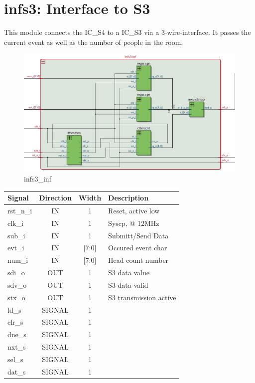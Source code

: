 \documentclass[12pt,a4 paper] {report}
\begin{document}
\section{infs3: Interface to S3}
This module connects the IC\_S4 to a IC\_S3 via a 3-wire-interface. It passes the current event as well as the number 
of people in the room.
\begin{figure}[h]
	\centering	
	\includegraphics[scale=0.25]{../png/infs3_inf.png}
	\caption{infs3\_inf}
\end{figure}
\begin{center}
	\begin{tabular}{ | p{2cm} | c | c | p{5cm} |}
		\hline
		\textbf{Signal} & \textbf{Direction} & \textbf{Width} & \textbf{Description} \\
		\hline	
  	rst\_n\_i & IN & 1 & Reset, active low \\
  	\hline
		clk\_i & IN & 1 & Syscp, @ 12MHz \\
		\hline
		sub\_i & IN & 1 & Submitt/Send Data \\
		\hline
		evt\_i & IN & [7:0] &  Occured event char \\
		\hline
		num\_i & IN & [7:0] & Head count number \\
		\hline
		sdi\_o & OUT & 1 & S3 data value \\
		\hline
		sdv\_o & OUT & 1 & S3 data valid \\
		\hline
		stx\_o & OUT & 1 & S3 transmission active\\
		\hline
		\hline
		ld\_s & SIGNAL & 1 & \\
		\hline
		clr\_s & SIGNAL & 1 & \\
		\hline
		dne\_s & SIGNAL & 1 & \\
		\hline
		nxt\_s & SIGNAL & 1 & \\
		\hline
		sel\_s & SIGNAL & 1 & \\
		\hline
		dat\_s & SIGNAL & 1 & \\
		\hline
	\end{tabular}
\end{center}
\newpage
\end{document}
